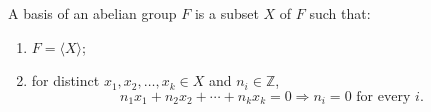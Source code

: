 A basis of an abelian group $F$ is a subset $X$ of $F$ such that:
\begin{enumerate}
\item $F = \langle X \rangle$;
\item for distinct $x_1, x_2, \ldots, x_k \in X$ and $n_i \in \mathbb{Z}$,
$$n_1x_1 + n_2x_2 + \cdots + n_kx_k = 0 \Rightarrow n_i = 0 \text{ for every } i.$$
\end{enumerate}
